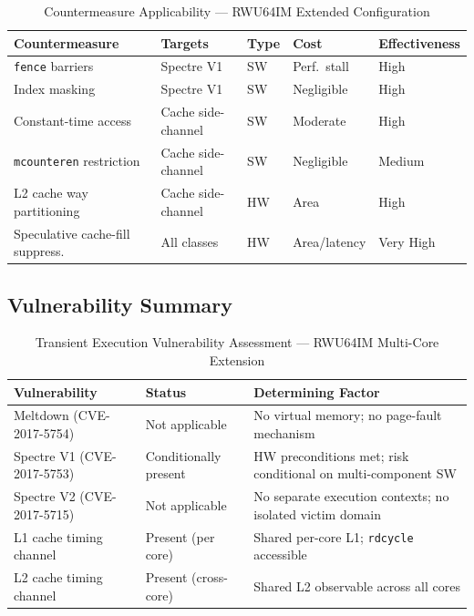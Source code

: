 \begin{table}[h]
\centering
\caption{Countermeasure Applicability — RWU64IM Extended Configuration}
\label{tab:countermeasures}
\begin{tabular}{lllll}
\hline
\textbf{Countermeasure} & \textbf{Targets} & \textbf{Type} &
\textbf{Cost} & \textbf{Effectiveness} \\
\hline
\texttt{fence} barriers          & Spectre V1          & SW & Perf.\ stall  & High \\
Index masking                    & Spectre V1          & SW & Negligible    & High \\
Constant-time access             & Cache side-channel  & SW & Moderate      & High \\
\texttt{mcounteren} restriction  & Cache side-channel  & SW & Negligible    & Medium \\
L2 cache way partitioning        & Cache side-channel  & HW & Area          & High \\
Speculative cache-fill suppress. & All classes         & HW & Area/latency  & Very High \\
\hline
\end{tabular}
\end{table}

\subsection{Vulnerability Summary}

\begin{table}[h]
\centering
\caption{Transient Execution Vulnerability Assessment — RWU64IM Multi-Core Extension}
\label{tab:vuln_summary_ch7}
\begin{tabular}{lll}
\hline
\textbf{Vulnerability} & \textbf{Status} & \textbf{Determining Factor} \\
\hline
Meltdown (CVE-2017-5754)   & Not applicable        &
  No virtual memory; no page-fault mechanism \\
Spectre V1 (CVE-2017-5753) & Conditionally present &
  HW preconditions met; risk conditional on multi-component SW \\
Spectre V2 (CVE-2017-5715) & Not applicable        &
  No separate execution contexts; no isolated victim domain \\
L1 cache timing channel    & Present (per core)    &
  Shared per-core L1; \texttt{rdcycle} accessible \\
L2 cache timing channel    & Present (cross-core)  &
  Shared L2 observable across all cores \\
\hline
\end{tabular}
\end{table}

